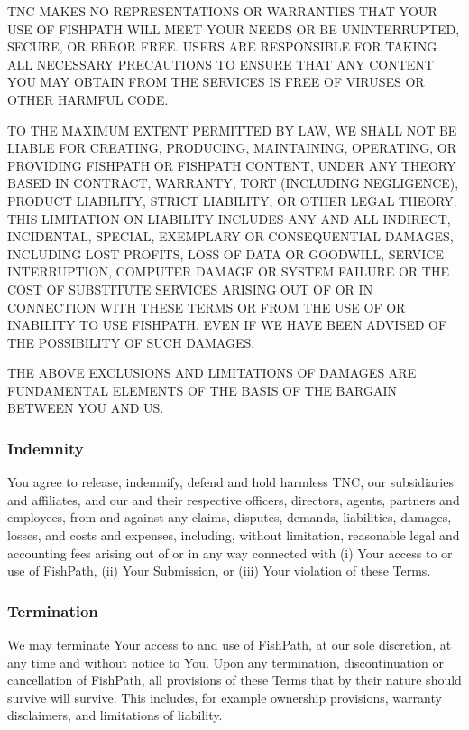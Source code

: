 \documentclass[
  11pt,
]{book}
\begin{document}
TNC MAKES NO REPRESENTATIONS OR WARRANTIES THAT YOUR USE OF FISHPATH WILL MEET YOUR NEEDS OR BE UNINTERRUPTED, SECURE, OR ERROR FREE. USERS ARE RESPONSIBLE FOR TAKING ALL NECESSARY PRECAUTIONS TO ENSURE THAT ANY CONTENT YOU MAY OBTAIN FROM THE SERVICES IS FREE OF VIRUSES OR OTHER HARMFUL CODE.

TO THE MAXIMUM EXTENT PERMITTED BY LAW, WE SHALL NOT BE LIABLE FOR CREATING, PRODUCING, MAINTAINING, OPERATING, OR PROVIDING FISHPATH OR FISHPATH CONTENT, UNDER ANY THEORY BASED IN CONTRACT, WARRANTY, TORT (INCLUDING NEGLIGENCE), PRODUCT LIABILITY, STRICT LIABILITY, OR OTHER LEGAL THEORY. THIS LIMITATION ON LIABILITY INCLUDES ANY AND ALL INDIRECT, INCIDENTAL, SPECIAL, EXEMPLARY OR CONSEQUENTIAL DAMAGES, INCLUDING LOST PROFITS, LOSS OF DATA OR GOODWILL, SERVICE INTERRUPTION, COMPUTER DAMAGE OR SYSTEM FAILURE OR THE COST OF SUBSTITUTE SERVICES ARISING OUT OF OR IN CONNECTION WITH THESE TERMS OR FROM THE USE OF OR INABILITY TO USE FISHPATH, EVEN IF WE HAVE BEEN ADVISED OF THE POSSIBILITY OF SUCH DAMAGES.

THE ABOVE EXCLUSIONS AND LIMITATIONS OF DAMAGES ARE FUNDAMENTAL ELEMENTS OF THE BASIS OF THE BARGAIN BETWEEN YOU AND US.

\hypertarget{indemnity}{%
\subsubsection*{Indemnity}\label{indemnity}}

You agree to release, indemnify, defend and hold harmless TNC, our subsidiaries and affiliates, and our and their respective officers, directors, agents, partners and employees, from and against any claims, disputes, demands, liabilities, damages, losses, and costs and expenses, including, without limitation, reasonable legal and accounting fees arising out of or in any way connected with (i) Your access to or use of FishPath, (ii) Your Submission, or (iii) Your violation of these Terms.

\hypertarget{termination}{%
\subsubsection*{Termination}\label{termination}}

We may terminate Your access to and use of FishPath, at our sole discretion, at any time and without notice to You. Upon any termination, discontinuation or cancellation of FishPath, all provisions of these Terms that by their nature should survive will survive. This includes, for example ownership provisions, warranty disclaimers, and limitations of liability.
\end{document}
